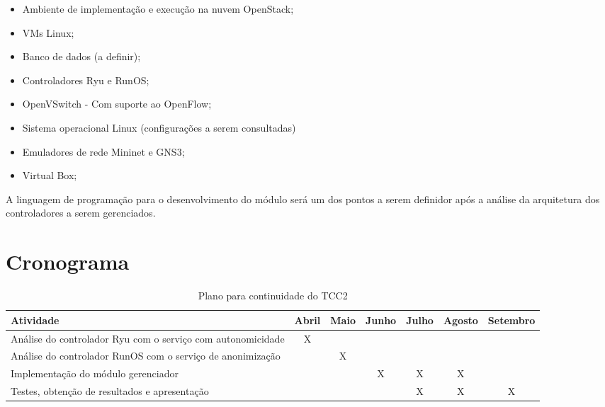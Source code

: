 \begin{itemize}
    \item Ambiente de implementação e execução na nuvem OpenStack;
    \item VMs Linux;
    \item Banco de dados (a definir);
    \item Controladores Ryu e RunOS;
    \item OpenVSwitch - Com suporte ao OpenFlow;
    \item Sistema operacional Linux (configurações a serem consultadas)
    \item Emuladores de rede Mininet e GNS3;
    \item Virtual Box;
\end{itemize}

 A linguagem de programação para o desenvolvimento do módulo será um dos pontos a serem definidor após a análise da arquitetura dos controladores a serem gerenciados.


 \section{Cronograma}
 
 
  
 \begin{table}[h]
 \begin{center}
 \caption{Plano para continuidade do TCC2}
\begin{tabular}{p{6cm} | c|c|c|c|c|c}
\hline 
\textbf{Atividade} & Abril & Maio & Junho & Julho & Agosto & Setembro \\ \hline 
Análise do controlador Ryu com o serviço com autonomicidade & X &  &  &  & & \\ \hline
 Análise do controlador RunOS com o serviço de anonimização & & X & & & &\\ \hline
Implementação do módulo gerenciador & & & X & X & X &\\ \hline
 Testes, obtenção de resultados e apresentação & & & & X & X & X\\ \hline

\end{tabular}
\end{center}
\label{cronograma}
\end{table}


